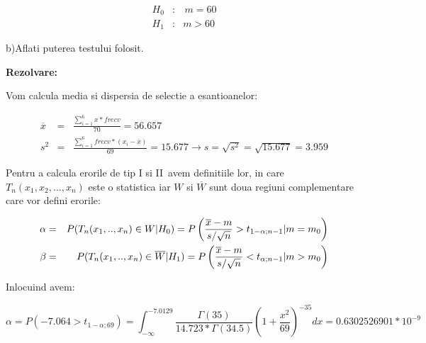 \documentclass{article}
\begin{document}
\begin{eqnarray*}
H_{0} &:&\,m=60 \\
H_{1} &:&m>60
\end{eqnarray*}

b)Aflati puterea testului folosit.

\textbf{Rezolvare:}

Vom calcula media si dispersia de selectie a esantioanelor:

\begin{eqnarray*}
\overline{x} &=&\frac{\sum_{i=1}^{6}x\ast frecv}{70}=56.657 \\
s^{2} &=&\frac{\sum_{i=1}^{6}frecv\ast (x_{i}-\overline{x})}{69}%
=15.677\rightarrow s=\sqrt{s^{2}}=\sqrt{15.677}=3.959
\end{eqnarray*}

Pentru a calcula erorile de tip I si II\ avem definitiile lor, in care $%
T_{n}(x_{1},x_{2},...,x_{n})$ este o statistica iar $W$ si $\overline{W}$
sunt doua regiuni complementare care vor defini erorile:

\begin{eqnarray*}
\alpha &=&P(T_{n}(x_{1},..,x_{n})\in W|H_{0})=P\left( \frac{\overline{x}-m}{%
s/\sqrt{n}}>t_{1-\alpha ;n-1}|m=m_{0}\right) \\
\beta &=&P(T_{n}(x_{1},..,x_{n})\in \overline{W}|H_{1})=P\left( \frac{%
\overline{x}-m}{s/\sqrt{n}}<t_{\alpha ;n-1}|m>m_{0}\right)
\end{eqnarray*}

\bigskip Inlocuind avem:

\[
\alpha =P(-7.064>t_{1-\alpha ;69})=\int_{-\infty }^{-7.0129}\frac{\Gamma (35)%
}{14.723\ast \Gamma (34.5)}(1+\frac{x^{2}}{69})^{-35}dx=0.6302526901\ast
10^{-9} 
\]
\end{document}
